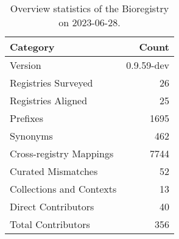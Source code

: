 \begin{table}
\caption{Overview statistics of the Bioregistry on 2023-06-28.}
\label{tab:bioregistry-summary}
\begin{tabular}{lr}
\toprule
Category & Count \\
\midrule
Version & 0.9.59-dev \\
Registries Surveyed & 26 \\
Registries Aligned & 25 \\
Prefixes & 1695 \\
Synonyms & 462 \\
Cross-registry Mappings & 7744 \\
Curated Mismatches & 52 \\
Collections and Contexts & 13 \\
Direct Contributors & 40 \\
Total Contributors & 356 \\
\bottomrule
\end{tabular}
\end{table}
